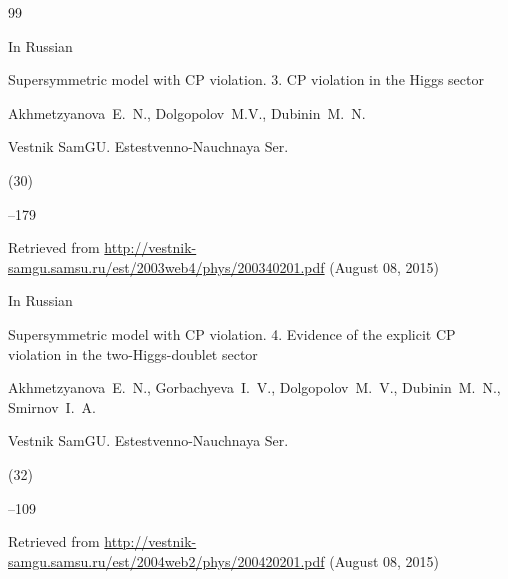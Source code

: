 \begin{thebibliography}{99}

\lang In Russian

\paper Supersymmetric model with CP violation. 3. CP violation in the Higgs sector

\by Akhmetzyanova~E.~N., Dolgopolov~M.V., Dubinin~M.~N.

\jour Vestnik SamGU. Estestvenno-Nauchnaya Ser.


(30)

--179

\elink  Retrieved from  \url{http://vestnik-samgu.samsu.ru/est/2003web4/phys/200340201.pdf} (August 08, 2015)




\lang In Russian

\paper Supersymmetric model with CP violation. 4. Evidence of the explicit CP violation in the two-Higgs-doublet sector

\by Akhmetzyanova~E.~N., Gorbachyeva~I.~V., Dolgopolov~M.~V.,  Dubinin~M.~N., Smirnov~I.~A.

\jour Vestnik SamGU. Estestvenno-Nauchnaya Ser.


(32)

--109

\elink  Retrieved from  \url{http://vestnik-samgu.samsu.ru/est/2004web2/phys/200420201.pdf} (August 08, 2015)







\end{thebibliography}



\EngDate







\renewcommand{\baselinestretch}{0.9}



\newpage

\Russian



%

